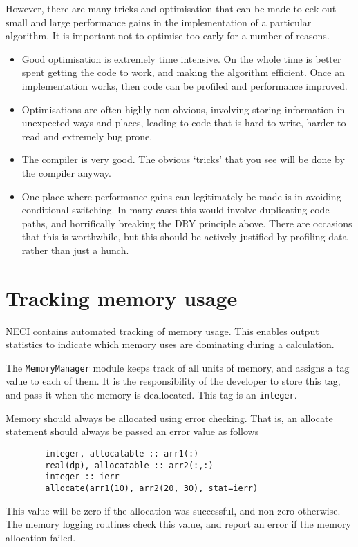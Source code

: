 \documentclass[a4paper,notitlepage]{scrreprt}
\let\code\lstinline
\begin{document}
	However, there are many tricks and optimisation that can be made to
	eek out small and large performance gains in the implementation of a
	particular algorithm. It is important not to optimise too early for a
	number of reasons.
	\begin{itemize}
		\item
			Good optimisation is extremely time intensive. On the whole time
			is better spent getting the code to work, and making the
			algorithm efficient. Once an implementation works, then code can
			be profiled and performance improved.
		\item
			Optimisations are often highly non-obvious, involving storing
			information in unexpected ways and places, leading to code that
			is hard to write, harder to read and extremely bug prone.
		\item
			The compiler is very good. The obvious `tricks' that you see will
			be done by the compiler anyway.
		\item
			One place where performance gains can legitimately be made is in
			avoiding conditional switching. In many cases this would involve
			duplicating code paths, and horrifically breaking the DRY
			principle above. There are occasions that this is worthwhile, but
			this should be actively justified by profiling data rather than
			just a hunch.
	\end{itemize}

\section{Tracking memory usage}
	NECI contains automated tracking of memory usage. This enables output
	statistics to indicate which memory uses are dominating during a
	calculation.

	The \code{MemoryManager} module keeps track of all units of memory, and
	assigns a tag value to each of them. It is the responsibility of the
	developer to store this tag, and pass it when the memory is deallocated.
	This tag is an \code{integer}.

	Memory should always be allocated using error checking. That is, an
	allocate statement should always be passed an error value as follows
	\begin{lstlisting}
		integer, allocatable :: arr1(:)
		real(dp), allocatable :: arr2(:,:)
		integer :: ierr
		allocate(arr1(10), arr2(20, 30), stat=ierr)
	\end{lstlisting}
	This value will be zero if the allocation was successful, and non-zero
	otherwise. The memory logging routines check this value, and report an
	error if the memory allocation failed.
\end{document}
